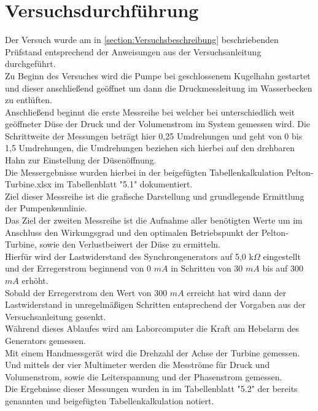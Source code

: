 \section{Versuchsdurchführung}
Der Versuch wurde am in \autoref{section:Versuchsbeschreibung} beschriebenden Prüfstand entsprechend der Anweisungen aus der Versuchsanleitung \cite[S.11-14]{Anleitung} durchgeführt.\\
Zu Beginn des Versuches wird die Pumpe bei geschlossenem Kugelhahn gestartet und dieser anschließend geöffnet um dann die Druckmessleitung im Wasserbecken zu entlüften.\\
Anschließend beginnt die erste Messreihe bei welcher bei unterschiedlich weit geöffneter Düse der Druck und der Volumenstrom im System gemessen wird.
Die Schrittweite der Messungen beträgt hier 0,25 Umdrehungen und geht von 0 bis 1,5 Umdrehungen, die Umdrehungen beziehen sich hierbei auf den drehbaren Hahn zur Einstellung der Düsenöffnung.\\
Die Messergebnisse wurden hierbei in der beigefügten Tabellenkalkulation Pelton-Turbine.xlsx im Tabellenblatt "5.1" dokumentiert.\\
Ziel dieser Messreihe ist die grafische Darstellung und grundlegende Ermittlung der Pumpenkennlinie.\\
\newline
Das Ziel der zweiten Messreihe ist die Aufnahme aller benötigten Werte um im Anschluss den Wirkungsgrad und den optimalen Betriebspunkt der Pelton-Turbine,
 sowie den Verlustbeiwert der Düse zu ermitteln.\\
 Hierfür wird der Lastwiderstand des Synchrongenerators auf 5,0 k$\Omega$ eingestellt und der Erregerstrom beginnend von 0 $mA$ in Schritten von 30 $mA$ bis auf 300 $mA$ erhöht.\\
 Sobald der Erregerstrom den Wert von 300 $mA$ erreicht hat wird dann der Lastwiderstand in unregelmäßigen Schritten entsprechend der Vorgaben aus der Versuchsanleitung \cite[S.12]{Anleitung} gesenkt.\\
 Während dieses Ablaufes wird am Laborcomputer die Kraft am Hebelarm des Generators gemessen.\\
 Mit einem Handmessgerät wird die Drehzahl der Achse der Turbine gemessen.\\
 Und mittels der vier Multimeter werden die Mesströme für Druck und Volumenstrom, sowie die Leiterspannung und der Phasenstrom gemessen.\\
 Die Ergebnisse dieser Messungen wurden in im Tabellenblatt "5.2" der bereits genannten und beigefügten Tabellenkalkulation notiert.\\
